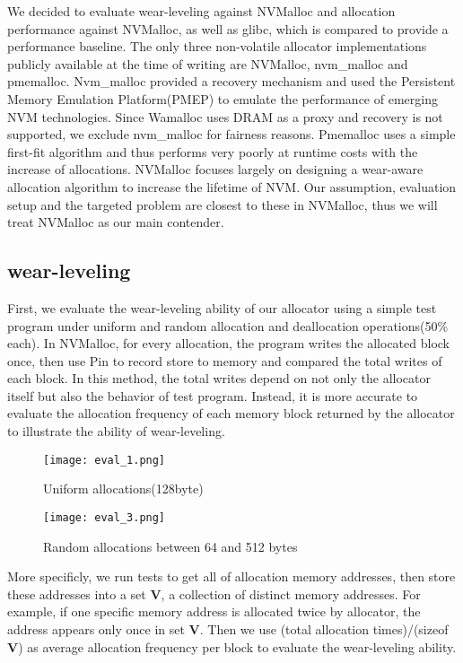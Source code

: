 \documentclass[10pt, conference, compsocconf]{IEEEtran}
\begin{document}
We decided to evaluate wear-leveling against NVMalloc and allocation performance against NVMalloc, as well as glibc,
which is compared to provide a performance baseline. 
The only three non-volatile allocator implementations publicly available at the time of writing are 
NVMalloc, nvm\_malloc\cite{schwalbnvm} and pmemalloc.
Nvm\_malloc provided a recovery mechanism and used the Persistent Memory Emulation Platform(PMEP)\cite{dulloor2014system} to emulate the performance of emerging NVM technologies.
Since Wamalloc uses DRAM as a proxy and recovery is not supported, we exclude nvm\_malloc for fairness reasons.
Pmemalloc uses a simple first-fit algorithm and thus performs very poorly at runtime costs with the increase of allocations.
NVMalloc focuses largely on designing a wear-aware allocation algorithm to increase the lifetime of NVM.
Our assumption, evaluation setup and the targeted problem are closest to these in NVMalloc, 
thus we will treat NVMalloc as our main contender.

\subsection{wear-leveling}

First, we evaluate the wear-leveling ability of our allocator
using a simple test program under uniform and random allocation and deallocation operations(50\% each).
In NVMalloc, for every allocation, the program writes the allocated block once, then use Pin\cite{luk2005pin} to record store to memory and compared the total writes of each block.
In this method, the total writes depend on not only the allocator itself but also the behavior of test program.
Instead, it is more accurate to evaluate the allocation frequency of each memory block 
returned by the allocator to illustrate the ability of wear-leveling.

\begin{figure}[t]
\centering
\texttt{[image: eval\_1.png]}
\caption{Uniform allocations(128byte)}
\label{fig:eval_1}
\end{figure}

\begin{figure}[t]
\centering
\texttt{[image: eval\_3.png]}
\caption{Random allocations between 64 and 512 bytes}
\label{fig:eval_3}
\end{figure}

More specificly, we run tests to get all of allocation memory addresses, 
then store these addresses into a set \textbf{V},
a collection of distinct memory addresses.
For example, if one specific memory address is allocated twice by allocator, the address appears only once in set \textbf{V}.
Then we use (total allocation times)/(sizeof \textbf{V}) as average allocation frequency per block to evaluate the wear-leveling ability.
\end{document}
